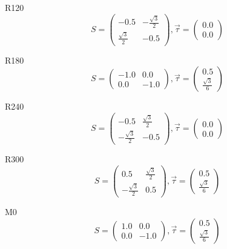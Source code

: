 \documentclass[12pt, fleqn]{article}
\begin{document}
R120
\begin{equation}
    S=
    \begin{pmatrix}
        -0.5&-\frac{\sqrt{3}}{2}\\
        \frac{\sqrt{3}}{2}&-0.5
    \end{pmatrix}
    ,\vec{\tau}=
    \begin{pmatrix}
        0.0\\
        0.0
    \end{pmatrix}
    \label{R120}
\end{equation}

R180
\begin{equation}
    S=
    \begin{pmatrix}
        -1.0&0.0\\
        0.0&-1.0
    \end{pmatrix}
    ,\vec{\tau}=
    \begin{pmatrix}
        0.5\\
        \frac{\sqrt{3}}{6}
    \end{pmatrix}
    \label{R180}
\end{equation}

R240
\begin{equation}
    S=
    \begin{pmatrix}
        -0.5&\frac{\sqrt{3}}{2}\\
        -\frac{\sqrt{3}}{2}&-0.5
    \end{pmatrix}
    ,\vec{\tau}=
    \begin{pmatrix}
        0.0\\
        0.0
    \end{pmatrix}
    \label{R240}
\end{equation}

R300
\begin{equation}
    S=
    \begin{pmatrix}
        0.5&\frac{\sqrt{3}}{2}\\
        -\frac{\sqrt{3}}{2}&0.5
    \end{pmatrix}
    ,\vec{\tau}=
    \begin{pmatrix}
        0.5\\
        \frac{\sqrt{3}}{6}
    \end{pmatrix}
    \label{R300}
\end{equation}

M0
\begin{equation}
    S=
    \begin{pmatrix}
        1.0&0.0\\
        0.0&-1.0
    \end{pmatrix}
    ,\vec{\tau}=
    \begin{pmatrix}
        0.5\\
        \frac{\sqrt{3}}{6}
    \end{pmatrix}
    \label{M0}
\end{equation}
\end{document}
